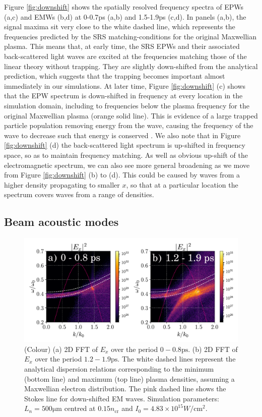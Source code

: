 Figure \ref{fig:downshift} shows the spatially resolved frequency spectra of
EPWs (a,c) and EMWs (b,d) at 0-0.7ps
(a,b) and 1.5-1.9ps (c,d). In panels (a,b), the signal maxima sit very close to
the white dashed line, which represents the frequencies predicted by the SRS
matching-conditions for the original Maxwellian plasma. This means that, at
early time, the SRS EPWs and their associated back-scattered light
waves are excited at the frequencies matching those of the linear theory
without trapping.
They are slightly down-shifted from the analytical prediction, which suggests
that the trapping
becomes important almost immediately in our simulations.
At later time, Figure \ref{fig:downshift} (c) shows that the EPW spectrum is
down-shifted in frequency
at every location in the simulation domain, including to frequencies below the
plasma frequency for the original Maxwellian plasma (orange solid line).
This is evidence of a large trapped particle population removing energy from
the wave, causing the frequency of the wave
to decrease such that energy is conserved \cite{Morales1972}. We also note that
in Figure \ref{fig:downshift} (d) the back-scattered light spectrum is
up-shifted in frequency space, so as to maintain frequency matching. As well as obvious up-shift of the electromagnetic spectrum, we can also see more general broadening as we move from Figure \ref{fig:downshift} (b) to (d). This could be caused by waves from a higher density propagating to smaller $x$, so that at a particular location the spectrum covers waves from a range of densities.



\subsection{Beam acoustic modes}
\begin{figure}[ht]
    \centering
    \includegraphics[width=0.8\columnwidth]{Chapters/C4_iSRS/fig5_5a_5b.pdf}
    \caption{(Colour) (a) 2D FFT of $E_x$ over the period $ 0 - 0.8 \si{\pico\second}$. (b) 2D FFT of $E_x$ over the period $1.2 - 1.9                                                                              
    \si{\pico\second}$.
    The white dashed lines represent the analytical dispersion relations corresponding to the minimum (bottom line) and maximum (top line) plasma densities,
    assuming a Maxwellian electron distribution.
    The pink dashed line shows the Stokes line for down-shifted EM waves.
    Simulation parameters: $L_n = 500 \si{\micro\metre} $ centred at $0.15n_\mathrm{cr}$
    and $I_0 = 4.83\times10^{15} \si{W/\centi\metre^2}$.
    }
    \label{fig:BAM}
\end{figure}{}

